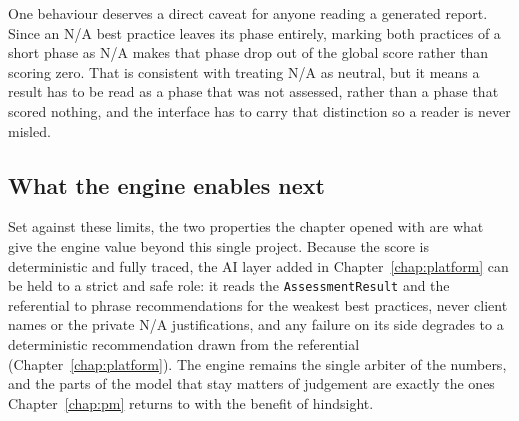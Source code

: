 One behaviour deserves a direct caveat for anyone reading a generated report. Since
an N/A best practice leaves its phase entirely, marking both practices of a short
phase as N/A makes that phase drop out of the global score rather than scoring zero.
That is consistent with treating N/A as neutral, but it means a result has to be read
as a phase that was not assessed, rather than a phase that scored nothing, and the
interface has to carry that distinction so a reader is never misled.

\subsection{What the engine enables next}

Set against these limits, the two properties the chapter opened with are what give
the engine value beyond this single project. Because the score is deterministic and
fully traced, the AI layer added in Chapter~\ref{chap:platform} can be held to a
strict and safe role: it reads the \texttt{AssessmentResult} and the referential to
phrase recommendations for the weakest best practices, never client names or the
private N/A justifications, and any failure on its side degrades to a deterministic
recommendation drawn from the referential (Chapter~\ref{chap:platform}). The engine remains the single arbiter of
the numbers, and the parts of the model that stay matters of judgement are exactly
the ones Chapter~\ref{chap:pm} returns to with the benefit of hindsight.


